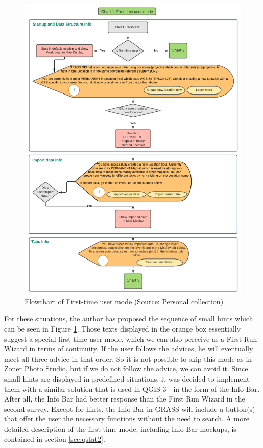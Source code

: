 \documentclass[a4paper,10pt,twoside]{article}
\begin{document}
\vspace{0.3cm}
\begin{figure}[hbt!] 
\begin{center}
\includegraphics[width=16cm]{../pictures/first-time_user_diagram.png} 
\caption[Flowchart of First-time user mode]{Flowchart of First-time user mode (Source: Personal collection)}
\label{fig:first-time_user_diagram}
\end{center}
\end{figure}

For these situations, the author has proposed the sequence of small hints which can be seen in Figure \ref{fig:first-time_user_diagram}. Those texts displayed in the orange box essentially suggest a special first-time user mode, which we can also perceive as a First Run Wizard in terms of continuity. If the user follows the advices, he will eventually meet all three advice in that order. So it is not possible to skip this mode as in Zoner Photo Studio, but if we do not follow the advice, we can avoid it. Since small hints are displayed in predefined situations, it was decided to implement them with a similar solution that is used in QGIS 3 - in the form of the Info Bar. After all, the Info Bar had better response than the First Run Wizard in the second survey. Except for hints, the Info Bar in GRASS will include a button(s) that offer the user the necessary functions without the need to search. A more detailed description of the first-time mode, including Info Bar mockups, is contained in section \ref{sec:qstat2}.
\end{document}
